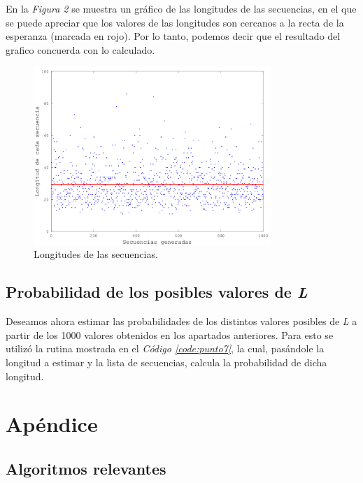 \documentclass{article}
\newcommand{\refcode}[1]{\textit{Código \ref{#1}}}
\begin{document}
\bigskip
En la \textit{Figura 2} se muestra un gráfico de las longitudes de las secuencias, en el que se puede apreciar que los valores de las longitudes son cercanos a la recta de la esperanza (marcada en rojo). Por lo tanto, podemos decir que el resultado del grafico concuerda con lo calculado. \\

\begin{figure}[h]
	\centering
	\includegraphics[width=0.80\textwidth]{images/longitudes.png}
	\caption{Longitudes de las secuencias.}
\end{figure}
\bigskip



\subsection{Probabilidad de los posibles valores de \textit{L}}

Deseamos ahora estimar las probabilidades de los distintos valores posibles de \textit{L} a partir de los 1000 valores obtenidos en los apartados anteriores. Para esto se utilizó la rutina mostrada en el \refcode{code:punto7}, la cual, pasándole la longitud a estimar y la lista de secuencias, calcula la probabilidad de dicha longitud.


\bigskip



\section{Apéndice}
\subsection{Algoritmos relevantes}
\end{document}
